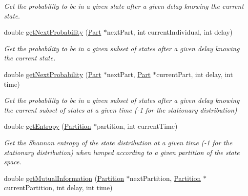 \begin{DoxyCompactItemize}
\begin{DoxyCompactList}\small\item\em Get the probability to be in a given state after a given delay knowing the current state. \end{DoxyCompactList}\item 
\hypertarget{class_markov_process_a254635ef2e405073dd19aa14aa4ec365}{double \hyperlink{class_markov_process_a254635ef2e405073dd19aa14aa4ec365}{get\-Next\-Probability} (\hyperlink{class_part}{Part} $\ast$next\-Part, int current\-Individual, int delay)}\label{class_markov_process_a254635ef2e405073dd19aa14aa4ec365}

\begin{DoxyCompactList}\small\item\em Get the probability to be in a given subset of states after a given delay knowing the current state. \end{DoxyCompactList}\item 
\hypertarget{class_markov_process_a72033d86b846a06449a005f796ec14c1}{double \hyperlink{class_markov_process_a72033d86b846a06449a005f796ec14c1}{get\-Next\-Probability} (\hyperlink{class_part}{Part} $\ast$next\-Part, \hyperlink{class_part}{Part} $\ast$current\-Part, int delay, int time)}\label{class_markov_process_a72033d86b846a06449a005f796ec14c1}

\begin{DoxyCompactList}\small\item\em Get the probability to be in a given subset of states after a given delay knowing the current subset of states at a given time (-\/1 for the stationary distribution) \end{DoxyCompactList}\item 
\hypertarget{class_markov_process_ad1d295d33c8abc5bdabea3eeaf33b553}{double \hyperlink{class_markov_process_ad1d295d33c8abc5bdabea3eeaf33b553}{get\-Entropy} (\hyperlink{class_partition}{Partition} $\ast$partition, int current\-Time)}\label{class_markov_process_ad1d295d33c8abc5bdabea3eeaf33b553}

\begin{DoxyCompactList}\small\item\em Get the Shannon entropy of the state distribution at a given time (-\/1 for the stationary distribution) when lumped according to a given partition of the state space. \end{DoxyCompactList}\item 
\hypertarget{class_markov_process_a37aa6fee427f28a0d44dc369a2fd3b6a}{double \hyperlink{class_markov_process_a37aa6fee427f28a0d44dc369a2fd3b6a}{get\-Mutual\-Information} (\hyperlink{class_partition}{Partition} $\ast$next\-Partition, \hyperlink{class_partition}{Partition} $\ast$current\-Partition, int delay, int time)}\label{class_markov_process_a37aa6fee427f28a0d44dc369a2fd3b6a}


\end{DoxyCompactItemize}
